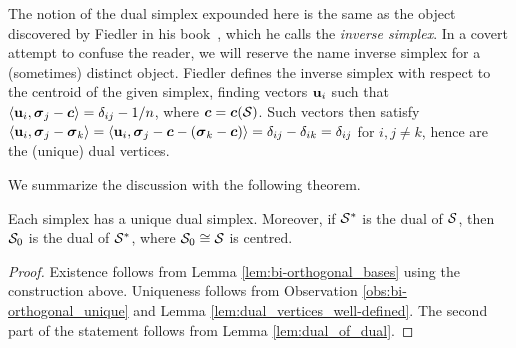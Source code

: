 \begin{remark}
	The notion of the dual simplex expounded here is the same as the object discovered by Fiedler in his book~\cite[Chapter 5]{fiedler2011matrices}, which he calls the \emph{inverse simplex}. In a covert attempt to confuse the reader, we will reserve the name inverse simplex for a (sometimes) distinct object. Fiedler defines the inverse simplex with respect to the centroid of the given simplex, finding vectors $\vb{u}_i$ such that $\langle \vb{u}_i,\vb*{\sigma}_j-\vb*{c}\rangle = \delta_{ij}-1/n$, where $\vb*{c}=\vb*{c}(\mathcal{S})$.  Such vectors then satisfy $\langle \vb{u}_i,\vb*{\sigma}_j-\vb*{\sigma}_k\rangle = \langle \vb{u}_i,\vb*{\sigma}_j-\vb*{c}-(\vb*{\sigma}_k-\vb*{c})\rangle = \delta_{ij}-\delta_{ik}=\delta_{ij}$ for $i,j\neq k$, hence are the (unique) dual vertices. 
\end{remark}

We summarize the discussion with the following theorem. 

\begin{theorem}
	\label{thm:dual_simplex}
Each simplex has a unique dual simplex. Moreover, if $\mathcal{S}^*$ is the dual of $\mathcal{S}$, then $\mathcal{S}_0$ is the dual of $\mathcal{S}^*$, where $\mathcal{S}_0\cong \mathcal{S}$ is centred. 
  
\end{theorem}
\begin{proof}
Existence follows from Lemma \ref{lem:bi-orthogonal_bases} using the construction above. Uniqueness follows from Observation \ref{obs:bi-orthogonal_unique} and Lemma \ref{lem:dual_vertices_well-defined}. The second part of the statement follows from Lemma \ref{lem:dual_of_dual}. 
\end{proof}

